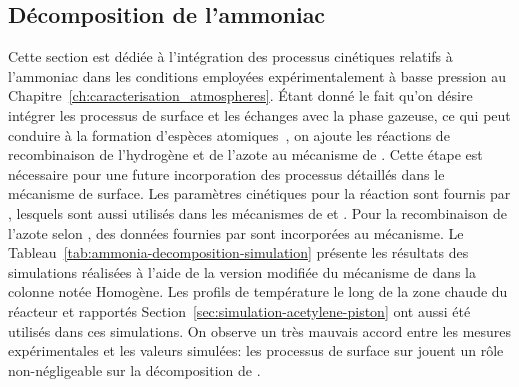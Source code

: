 \subsection{Décomposition de l'ammoniac}
\label{sec:simulation-ammoniac-piston}

Cette section est dédiée à l'intégration des processus cinétiques relatifs à l'ammoniac dans les conditions employées expérimentalement à basse pression au Chapitre~\ref{ch:caracterisation_atmospheres}. Étant donné le fait qu'on désire intégrer les processus de surface et les échanges avec la phase gazeuse, ce qui peut conduire à la formation d'espèces atomiques~\cite{Ertl1980}, on ajoute les réactions de recombinaison de l'hydrogène et de l'azote au mécanisme de \citet{Dirtu2006}. Cette étape est nécessaire pour une future incorporation des processus détaillés dans le mécanisme de surface. Les paramètres cinétiques pour la réaction  sont fournis par \citet{Warnatz1984}, lesquels sont aussi utilisés dans les mécanismes de \citet{Norinaga2009} et \citet{AAUmech}. Pour la recombinaison de l'azote selon , des données fournies par \citet{Clyne1967} sont incorporées au mécanisme. Le Tableau~\ref{tab:ammonia-decomposition-simulation} présente les résultats des simulations réalisées à l'aide de la version modifiée du mécanisme de \citet{Dirtu2006} dans la colonne notée \og{}Homogène\fg{}. Les profils de température le long de la zone chaude du réacteur et rapportés Section~\ref{sec:simulation-acetylene-piston} ont aussi été utilisés dans ces simulations. On observe un très mauvais accord entre les mesures expérimentales et les valeurs simulées: les processus de surface sur  jouent un rôle non-négligeable sur la décomposition de . 

